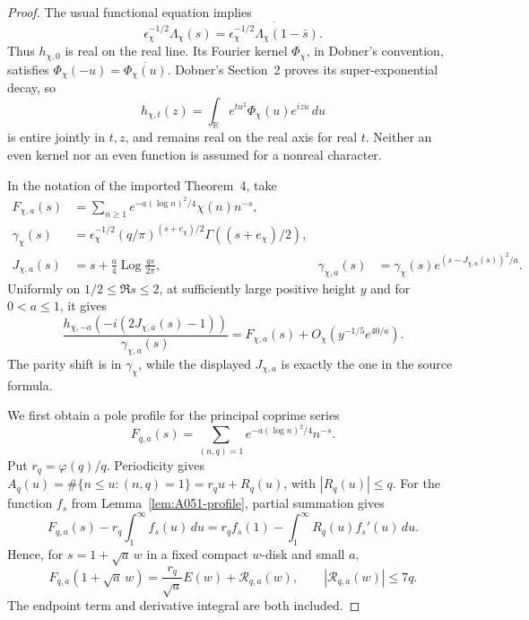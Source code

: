 \begin{proof}
The usual functional equation implies
\[
 \epsilon_\chi^{-1/2}\Lambda_\chi(s)
   =\overline{\epsilon_\chi^{-1/2}
                           \Lambda_\chi(1-\bar s)}.
\]
Thus \(h_{\chi,0}\) is real on the real line. Its Fourier kernel
\(\Phi_\chi\), in Dobner's convention, satisfies
\(\Phi_\chi(-u)=\overline{\Phi_\chi(u)}\).
Dobner's Section~2 proves its super-exponential decay, so
\[
       h_{\chi,t}(z)=\int_{\mathbb R}
                       e^{tu^2}\Phi_\chi(u)e^{izu}\,du
\]
is entire jointly in \(t,z\), and remains real on the real axis
for real \(t\). Neither an even kernel nor an even function is
assumed for a nonreal character.

In the notation of the imported Theorem~4, take
\begin{align*}
 F_{\chi,a}(s)&=\sum_{n\ge1}
             e^{-a(\log n)^2/4}\chi(n)n^{-s},\\
 \gamma_\chi(s)&=\epsilon_\chi^{-1/2}
                 (q/\pi)^{(s+e_\chi)/2}\Gamma((s+e_\chi)/2),\\
 J_{\chi,a}(s)&=s+\frac a4\operatorname{Log}\frac{qs}{2\pi},
 &\gamma_{\chi,a}(s)&=\gamma_\chi(s)
              e^{(s-J_{\chi,a}(s))^2/a}.
\end{align*}
Uniformly on \(1/2\le\Re s\le2\), at sufficiently large positive
height \(y\) and for \(0<a\le1\), it gives
\begin{equation}\label{eq:A051-character-Dobner}
 \frac{h_{\chi,-a}(-i(2J_{\chi,a}(s)-1))}
                       {\gamma_{\chi,a}(s)}
      =F_{\chi,a}(s)+O_\chi(y^{-1/5}e^{40/a}).
\end{equation}
The parity shift is in \(\gamma_\chi\), while the displayed
\(J_{\chi,a}\) is exactly the one in the source formula.

We first obtain a pole profile for the principal coprime series
\[
              F_{q,a}(s)=\sum_{(n,q)=1}
                              e^{-a(\log n)^2/4}n^{-s}.
\]
Put \(r_q=\varphi(q)/q\). Periodicity gives
\(A_q(u)=\#\{n\le u:(n,q)=1\}=r_qu+R_q(u)\), with
\(|R_q(u)|\le q\).
For the function \(f_s\) from Lemma~\ref{lem:A051-profile},
partial summation gives
\[
 F_{q,a}(s)-r_q\int_1^\infty f_s(u)\,du
             =r_q f_s(1)-\int_1^\infty R_q(u)f_s'(u)\,du.
\]
Hence, for \(s=1+\sqrt a\,w\) in a fixed compact \(w\)-disk and
small \(a\),
\begin{equation}\label{eq:A051-coprimeprofile}
          F_{q,a}(1+\sqrt a\,w)
                 =\frac{r_q}{\sqrt a}E(w)+\mathcal R_{q,a}(w),
                     \qquad |\mathcal R_{q,a}(w)|\le7q.
\end{equation}
The endpoint term and derivative integral are both included.


\end{proof}
